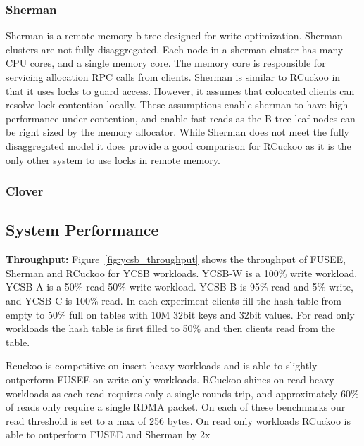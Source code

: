 \subsubsection{Sherman}

Sherman is a remote memory b-tree designed for write
optimization. Sherman clusters are not fully disaggregated.
Each node in a sherman cluster has many CPU cores, and a
single memory core. The memory core is responsible for
servicing allocation RPC calls from clients. Sherman is
similar to RCuckoo in that it uses locks to guard access.
However, it assumes that colocated clients can resolve lock
contention locally. These assumptions enable sherman to have
high performance under contention, and enable fast reads as
the B-tree leaf nodes can be right sized by the memory
allocator. While Sherman does not meet the fully
disaggregated model it does provide a good comparison for
RCuckoo as it is the only other system to use locks in
remote memory.


\subsubsection{Clover}

\subsection{System Performance}

\textbf{Throughput:} Figure~\ref{fig:ycsb_throughput} shows
the throughput of FUSEE, Sherman and RCuckoo for YCSB
workloads. YCSB-W is a 100\% write workload. YCSB-A is a
50\% read 50\% write workload. YCSB-B is 95\% read and 5\%
write, and YCSB-C is 100\% read.  In each experiment clients
fill the hash table from empty to 50\% full on tables with
10M 32bit keys and 32bit values. For read only workloads the
hash table is first filled to 50\% and then clients read
from the table.  

Rcuckoo is competitive on insert heavy workloads and is able
to slightly outperform FUSEE on write only workloads.
RCuckoo shines on read heavy workloads as each read requires
only a single rounds trip, and approximately 60\% of reads
only require a single RDMA packet. On each of these
benchmarks our read threshold is set to a max of 256 bytes.
On read only workloads RCuckoo is able to outperform FUSEE
and Sherman by 2x ~


